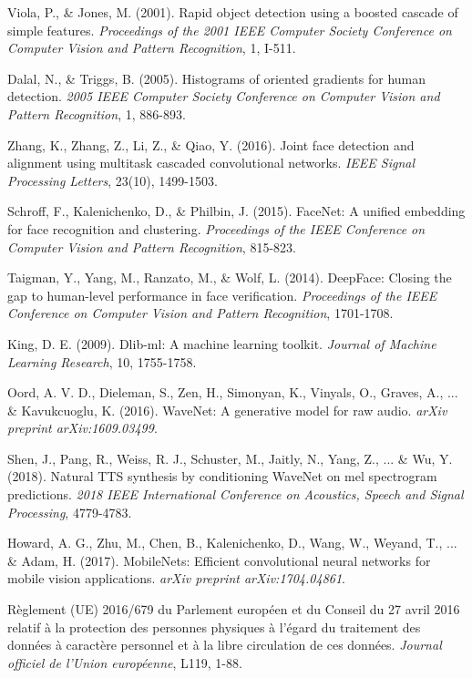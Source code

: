 \documentclass[12pt,a4paper]{article}
\begin{document}
\begin{thebibliography}{99}

Viola, P., \& Jones, M. (2001). Rapid object detection using a boosted cascade of simple features. \textit{Proceedings of the 2001 IEEE Computer Society Conference on Computer Vision and Pattern Recognition}, 1, I-511.

Dalal, N., \& Triggs, B. (2005). Histograms of oriented gradients for human detection. \textit{2005 IEEE Computer Society Conference on Computer Vision and Pattern Recognition}, 1, 886-893.

Zhang, K., Zhang, Z., Li, Z., \& Qiao, Y. (2016). Joint face detection and alignment using multitask cascaded convolutional networks. \textit{IEEE Signal Processing Letters}, 23(10), 1499-1503.

Schroff, F., Kalenichenko, D., \& Philbin, J. (2015). FaceNet: A unified embedding for face recognition and clustering. \textit{Proceedings of the IEEE Conference on Computer Vision and Pattern Recognition}, 815-823.

Taigman, Y., Yang, M., Ranzato, M., \& Wolf, L. (2014). DeepFace: Closing the gap to human-level performance in face verification. \textit{Proceedings of the IEEE Conference on Computer Vision and Pattern Recognition}, 1701-1708.

King, D. E. (2009). Dlib-ml: A machine learning toolkit. \textit{Journal of Machine Learning Research}, 10, 1755-1758.

Oord, A. V. D., Dieleman, S., Zen, H., Simonyan, K., Vinyals, O., Graves, A., ... \& Kavukcuoglu, K. (2016). WaveNet: A generative model for raw audio. \textit{arXiv preprint arXiv:1609.03499}.

Shen, J., Pang, R., Weiss, R. J., Schuster, M., Jaitly, N., Yang, Z., ... \& Wu, Y. (2018). Natural TTS synthesis by conditioning WaveNet on mel spectrogram predictions. \textit{2018 IEEE International Conference on Acoustics, Speech and Signal Processing}, 4779-4783.

Howard, A. G., Zhu, M., Chen, B., Kalenichenko, D., Wang, W., Weyand, T., ... \& Adam, H. (2017). MobileNets: Efficient convolutional neural networks for mobile vision applications. \textit{arXiv preprint arXiv:1704.04861}.

Règlement (UE) 2016/679 du Parlement européen et du Conseil du 27 avril 2016 relatif à la protection des personnes physiques à l'égard du traitement des données à caractère personnel et à la libre circulation de ces données. \textit{Journal officiel de l'Union européenne}, L119, 1-88.

\end{thebibliography}
\end{document}
